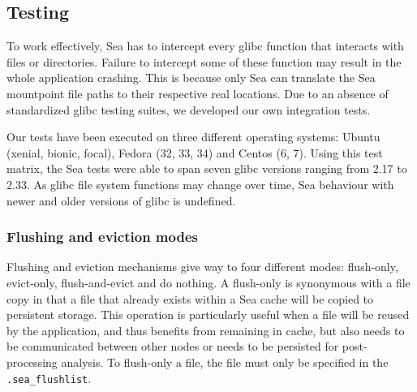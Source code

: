 


\subsection{Testing}
To work effectively, Sea has to intercept every glibc function that interacts with files or
directories. Failure to intercept some of these function may result in the whole application
crashing. This is because only Sea can translate the Sea mountpoint file paths to their
respective real locations. Due to an absence of standardized glibc testing suites,
we developed our own integration tests.

Our tests have been executed on three different operating systems: Ubuntu (xenial, bionic, focal),
Fedora (32, 33, 34) and Centos (6, 7). Using this test matrix, the Sea tests were able to span seven glibc
versions ranging from 2.17 to 2.33. As glibc file system functions may change over time, Sea behaviour with
newer and older versions of glibc is undefined. 



\subsubsection{Flushing and eviction modes}
Flushing and eviction mechanisms give way to four different modes: flush-only,
evict-only, flush-and-evict and do nothing. A flush-only is synonymous with a
file copy in that a file that already exists within a Sea cache will be copied
to persistent storage. This operation is particularly useful when a file will be
reused by the application, and thus benefits from remaining in cache, but also
needs to be communicated between other nodes or needs to be persisted for
post-processing analysis. To flush-only a file, the file must only be specified
in the \texttt{.sea\_flushlist}.

